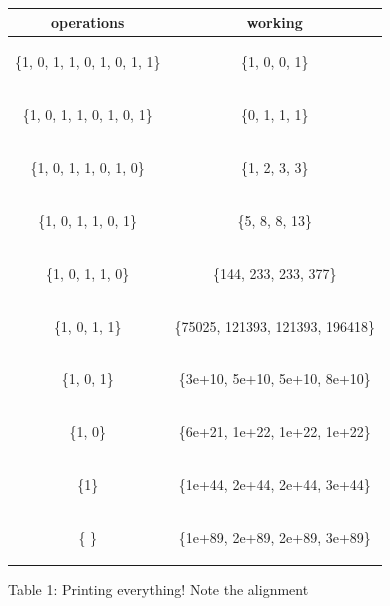 \documentclass[a4paper,11pt]{article}
\numberwithin{definition}{section}
\numberwithin{mytheorem}{subsection}
\begin{document}
\centering
\begin{tabular}{ c|c } 
 \hline
 \textbf{operations} & \textbf{working}  \\ 
 \hline
 \begin{flushleft} \{1, 0, 1, 1, 0, 1, 0, 1, 1\}\end{flushleft} & \{1, 0, 0, 1\}  \\ 
 \hline
 \begin{flushleft} \{1, 0, 1, 1, 0, 1, 0, 1\}\end{flushleft} & \{0, 1, 1, 1\}  \\ 
 \hline
 \begin{flushleft} \{1, 0, 1, 1, 0, 1, 0\}\end{flushleft} & \{1, 2, 3, 3\}  \\ 
 \hline
\begin{flushleft} \{1, 0, 1, 1, 0, 1\}\end{flushleft} & \{5, 8, 8, 13\}  \\ 
 \hline
 \begin{flushleft} \{1, 0, 1, 1, 0\}\end{flushleft} & \{144, 233, 233, 377\}  \\ 
 \hline
 \begin{flushleft} \{1, 0, 1, 1\}\end{flushleft} & \{75025, 121393, 121393, 196418\}  \\ 
 \hline
 \begin{flushleft} \{1, 0, 1\}\end{flushleft} & \{3e+10, 5e+10, 5e+10, 8e+10\}  \\
 \hline
 \begin{flushleft} \{1, 0\}\end{flushleft}  & \{6e+21, 1e+22,  1e+22, 1e+22\}  \\ 
 \hline
 \begin{flushleft} \{1\}\end{flushleft}  & \{1e+44, 2e+44, 2e+44, 3e+44\}  \\
 \hline
 \begin{flushleft} \{ \}\end{flushleft}  & \{1e+89, 2e+89, 2e+89, 3e+89\} \\ 
 
 
 
 \hline
\end{tabular}

Table 1: Printing everything! Note the alignment

\end{document}
